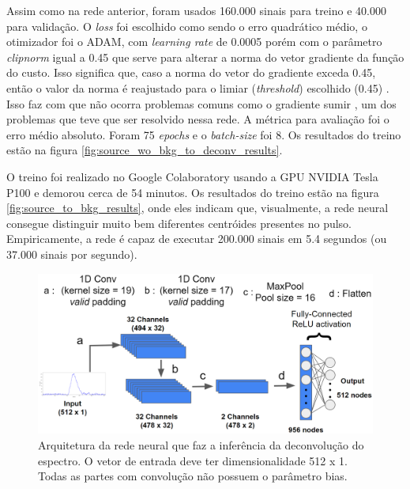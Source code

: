 \documentclass[a4paper,12pt,oneside]{book}
\begin{document}
\par Assim como na rede anterior, foram usados 160.000 sinais para treino e 40.000 para validação. O \textit{loss} foi escolhido como sendo o erro quadrático médio, o otimizador foi o ADAM, com \textit{learning rate} de 0.0005 porém com o parâmetro \textit{clipnorm} igual a 0.45 que serve para alterar a norma do vetor gradiente da função do custo. Isso significa que, caso a norma do vetor do gradiente exceda 0.45, então o valor da norma é reajustado para o limiar (\textit{threshold}) escolhido (0.45) \cite{FORTINO2022166497}. Isso faz com que não ocorra problemas comuns como o gradiente sumir \cite{VGP, ADAMAX}, um dos problemas que teve que ser resolvido nessa rede. A métrica para avaliação foi o erro médio absoluto. Foram 75 \textit{epochs} e o \textit{batch-size} foi 8. Os resultados do treino estão na figura \ref{fig:source_wo_bkg_to_deconv_results}.


\par O treino foi realizado no Google Colaboratory \cite{google_colab} usando a GPU NVIDIA Tesla P100 e demorou cerca de 54 minutos. Os resultados do treino estão na figura \ref{fig:source_to_bkg_results}, onde eles indicam que, visualmente, a rede neural consegue distinguir muito bem diferentes centróides presentes no pulso. Empiricamente, a rede é capaz de executar 200.000 sinais em 5.4 segundos (ou 37.000 sinais por segundo).

\begin{figure}[H]
    \centering
    \includegraphics[scale = 0.28]{figs/source_wobkg_to_deconv.png}
    \caption{Arquitetura da rede neural que faz a inferência da deconvolução do espectro. O vetor de entrada deve ter dimensionalidade 512 x 1. Todas as partes com convolução não possuem o parâmetro bias.}
    \label{fig:source_to_deconv}
\end{figure}
\end{document}
